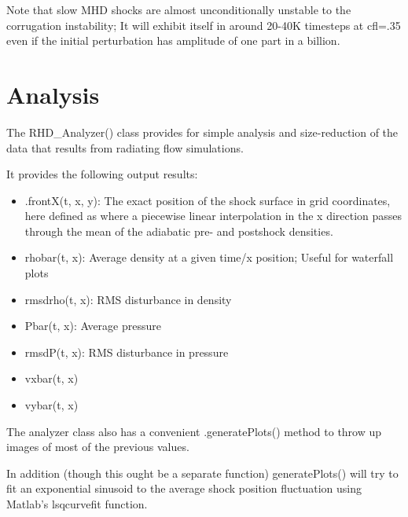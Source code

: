 \documentclass[letterpaper,12pt,twocolumn]{article}
\begin{document}
Note that slow MHD shocks are almost unconditionally unstable to the corrugation
instability; It will exhibit itself in around 20-40K timesteps at cfl=.35 even if the
initial perturbation has amplitude of one part in a billion.

\section{Analysis}

The RHD\_Analyzer() class provides for simple analysis and size-reduction of the data
that results from radiating flow simulations.

It provides the following output results:
\begin{itemize}
\item .frontX(t, x, y): The exact position of the shock surface in grid coordinates,
here defined as where a piecewise linear interpolation in the x direction passes through
the mean of the adiabatic pre- and postshock densities.
\item rhobar(t, x): Average density at a given time/x position; Useful for waterfall plots
\item rmsdrho(t, x): RMS disturbance in density
\item Pbar(t, x): Average pressure
\item rmsdP(t, x): RMS disturbance in pressure
\item vxbar(t, x)
\item vybar(t, x)
\end{itemize}

The analyzer class also has a convenient .generatePlots() method to throw up
images of most of the previous values.

In addition (though this ought be a separate function) generatePlots() will
try to fit an exponential sinusoid to the average shock position fluctuation using
Matlab's lsqcurvefit function.
\end{document}
